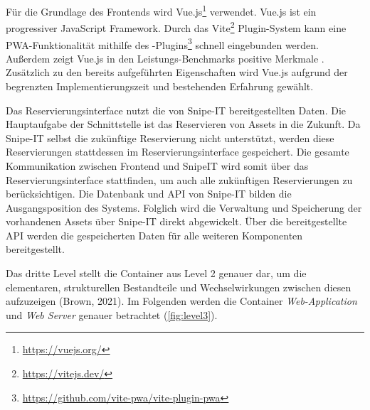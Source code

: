 Für die Grundlage des Frontends wird Vue.js\footnote{\url{https://vuejs.org/}}
verwendet. Vue.js ist ein progressiver JavaScript Framework. Durch das
Vite\footnote{\url{https://vitejs.dev/}} Plugin-System kann eine
PWA-Funktionalität mithilfe des
-Plugins\footnote{\url{https://github.com/vite-pwa/vite-plugin-pwa}}
schnell eingebunden werden. Außerdem zeigt Vue.js in den Leistungs-Benchmarks
positive Merkmale . Zusätzlich zu den bereits
aufgeführten Eigenschaften wird Vue.js aufgrund der begrenzten
Implementierungszeit und bestehenden Erfahrung gewählt.

Das Reservierungsinterface nutzt die von Snipe-IT bereitgestellten Daten. Die
Hauptaufgabe der Schnittstelle ist das Reservieren von Assets in die Zukunft. Da
Snipe-IT selbst die zukünftige Reservierung nicht unterstützt, werden diese
Reservierungen stattdessen im Reservierungsinterface gespeichert. Die gesamte
Kommunikation zwischen Frontend und SnipeIT wird somit über das
Reservierungsinterface stattfinden, um auch alle zukünftigen Reservierungen zu
berücksichtigen. Die Datenbank und API von Snipe-IT bilden die Ausgangsposition
des Systems. Folglich wird die Verwaltung und Speicherung der vorhandenen Assets
über Snipe-IT direkt abgewickelt. Über die bereitgestellte API werden die
gespeicherten Daten für alle weiteren Komponenten bereitgestellt.

    {\sffamily\color{maincolor}{Level 3: Components}}

Das dritte Level stellt die Container aus Level 2 genauer dar, um die
elementaren, strukturellen Bestandteile und Wechselwirkungen zwischen diesen
aufzuzeigen (Brown, 2021). Im Folgenden werden die Container
\textit{Web-Application} und \textit{Web Server} genauer betrachtet
(\ref{fig:level3}).

